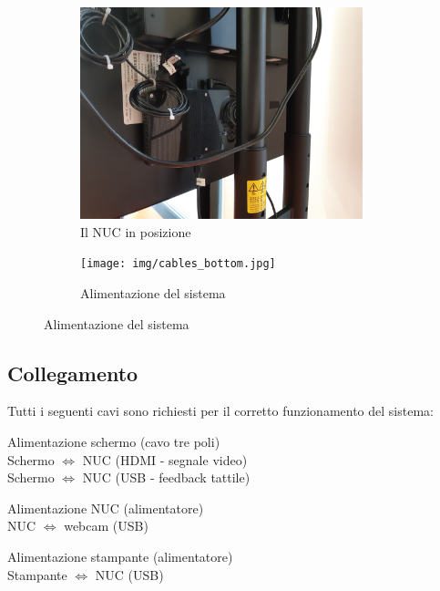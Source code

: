 \documentclass[12pt]{article}
\begin{document}
    \begin{figure}[H]
        \begin{subfigure}{0.5\textwidth}
                \includegraphics[width=0.9\textwidth]{img/nuc_2.jpg}
                \caption*{Il NUC in posizione}
        \end{subfigure}        
        \begin{subfigure}{0.5\textwidth}
                \texttt{[image: img/cables\_bottom.jpg]}
                \caption*{Alimentazione del sistema}
		\end{subfigure}                
	\end{figure}	
    
    \newpage
    
    
	\subsection{Collegamento}
	
		Tutti i seguenti cavi sono richiesti per il corretto funzionamento del sistema:
	
		Alimentazione schermo (cavo tre poli)\\
		Schermo $\Leftrightarrow$ NUC (HDMI - segnale video)\\
		Schermo $\Leftrightarrow$ NUC (USB - feedback tattile)
		
		Alimentazione NUC (alimentatore)\\
		NUC $\Leftrightarrow$ webcam (USB)
		
		Alimentazione stampante (alimentatore)\\
		Stampante $\Leftrightarrow$ NUC (USB)\\
	
\end{document}
